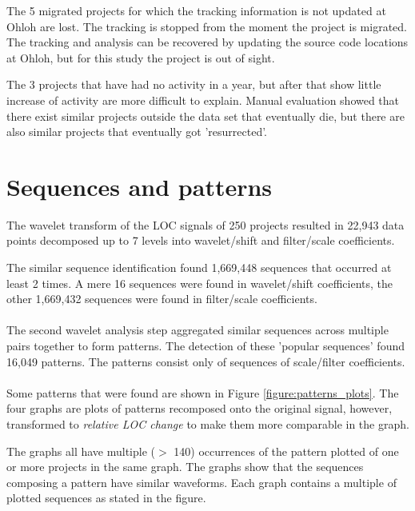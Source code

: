 The 5 migrated projects for which the tracking information is not updated at
Ohloh are lost. The tracking is stopped from the moment the project is
migrated. The tracking and analysis can be recovered by updating the source
code locations at Ohloh, but for this study the project is out of sight.

The 3 projects that have had no activity in a year, but after that show little
increase of activity are more difficult to explain. Manual evaluation showed
that there exist similar projects outside the data set that eventually die, but
there are also similar projects that eventually got 'resurrected'.



\section{Sequences and patterns}
\label{section:seqs_patterns}
The wavelet transform of the LOC signals of 250 projects resulted in 22,943
data points decomposed up to 7 levels into wavelet/shift and filter/scale
coefficients.

The similar sequence identification found 1,669,448 sequences that occurred
at least 2 times. A mere 16 sequences were found in wavelet/shift coefficients,
the other 1,669,432 sequences were found in filter/scale coefficients.

\paragraph{}
The second wavelet analysis step aggregated similar sequences across multiple
pairs together to form patterns. The detection of these 'popular sequences'
found 16,049 patterns. The patterns consist only of sequences of scale/filter
coefficients.

\paragraph{}
Some patterns that were found are shown in Figure \ref{figure:patterns_plots}.
The four graphs are plots of patterns recomposed onto the original signal,
however, transformed to \textit{relative LOC change} to make them more
comparable in the graph.

The graphs all have multiple ($>$ 140) occurrences of the pattern plotted of one
or more projects in the same graph. The graphs show that the sequences
composing a pattern have similar waveforms. Each graph contains a multiple of
plotted sequences as stated in the figure.

